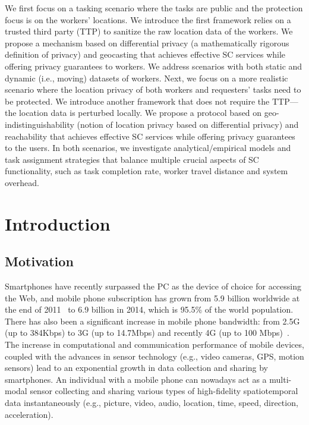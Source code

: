 \documentclass{USC-Thesis}
\numberwithin{equation}{chapter}
\begin{document}
We first focus on a tasking scenario where the tasks are public and the protection focus is on the workers' locations. We introduce the first framework relies on a trusted third party (TTP) to sanitize the raw location data of the workers. We propose a mechanism based on differential privacy (a mathematically rigorous definition of privacy) and geocasting that achieves effective SC services while offering privacy guarantees to workers. We address scenarios with both static and dynamic (i.e., moving) datasets of workers. Next, we focus on a more realistic scenario where the location privacy of both workers and requesters' tasks need to be protected. We introduce another framework that does not require the TTP---the location data is perturbed locally. We propose a protocol based on geo-indistinguishability (notion of location privacy based on differential privacy) and reachability that achieves effective SC services while offering privacy guarantees to the users. In both scenarios, we investigate analytical/empirical models and task assignment strategies that balance multiple crucial aspects of SC functionality, such as task completion rate, worker travel distance and system overhead.

\chapter{Introduction}\label{ch.intro}
\section{Motivation}

Smartphones have recently surpassed the PC as the device of choice for accessing the Web, and mobile phone subscription has grown from 5.9 billion worldwide at the end of 2011~\cite{mobile2014mobile} to 6.9 billion in 2014, which is 95.5\% of the world population. There has also been a significant increase in mobile phone bandwidth: from 2.5G (up to 384Kbps) to 3G (up to 14.7Mbps) and recently 4G (up to 100 Mbps)~\cite{sauter2009mobile}.
The increase in computational and communication performance of mobile devices, coupled with the advances in sensor technology (e.g., video cameras, GPS, motion sensors) lead to an exponential growth in data collection and sharing by smartphones. An individual with a mobile phone can nowadays act as a multi-modal sensor collecting and sharing various types of high-fidelity spatiotemporal data instantaneously (e.g., picture, video, audio, location, time, speed, direction, acceleration).
\end{document}
